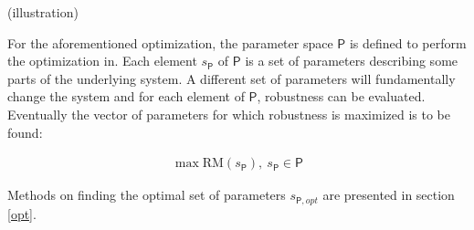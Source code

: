     (illustration)

    For the aforementioned optimization, the parameter space $\mathsf{P}$ is defined to perform the optimization in. Each element $s_{\mathsf{P}}$ of $\mathsf{P}$ is a set of parameters describing some parts of the underlying system. A different set of parameters will fundamentally change the system and for each element of $\mathsf{P}$, robustness can be evaluated. Eventually the vector of parameters for which robustness is maximized is to be found:

    \begin{gather}\label{eq:10} \max \text{RM}(s_{\mathsf{P}}),\ s_{\mathsf{P}}  \in \mathsf{P}\end{gather}

    Methods on finding the optimal set of parameters $s_{\mathsf{P},opt}$ are presented in section \ref{opt}.









